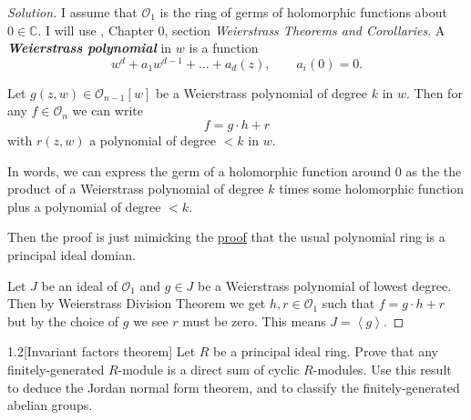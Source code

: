 \begin{proof}[Solution]\leavevmode
	I assume that $\mathcal{O}_1$ is the ring of germs of holomorphic functions about $0\in\mathbb{C}$. I will use \cite{gri}, Chapter 0, section \textit{Weierstrass Theorems and Corollaries}. A \textit{\textbf{Weierstrass polynomial}} in $w$ is a function
	\[w^d+a_1w^{d-1}+\ldots+a_d(z),\qquad a_i(0)=0.\]

\begin{thm}\leavevmode
	Let $g(z,w)\in\mathcal{O}_{n-1}[w]$ be a Weierstrass polynomial of degree $k$ in $w$. Then for any $f\in\mathcal{O}_n$ we can write
	\[f=g\cdot h+r\]
	with $r(z,w)$ a polynomial of degree $<k$ in $w$.
\end{thm}
In words, we can express the germ of a holomorphic function around 0 as the the product of a Weierstrass polynomial of degree $k$ times some holomorphic function plus a polynomial of degree $<k$.

Then the proof is just mimicking the \href{https://proofwiki.org/wiki/Polynomial_Forms_over_Field_form_Principal_Ideal_Domain}{proof} that the usual polynomial ring is a principal ideal domian.

Let $J$ be an ideal of $\mathcal{O}_1$ and $g\in J$ be a Weierstrass polynomial of lowest degree. Then by Weierstrass Division Theorem we get $h,r\in\mathcal{O}_1$ such that $f=g\cdot h+r$ but by the choice of $g$ we see $r$ must be zero. This means $J=\left<g\right> $.
\end{proof}

\begin{manualexercise}{1.2}[Invariant factors theorem]
	Let $R$ be a principal ideal ring. Prove that any finitely-generated $R$-module is a direct sum of cyclic $R$-modules. Use this result to deduce the Jordan normal form theorem, and to classify the finitely-generated abelian groups.	
\end{manualexercise}


